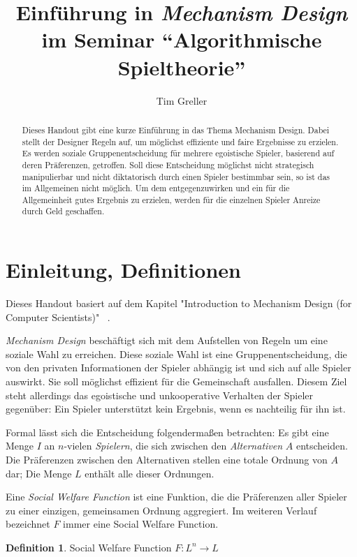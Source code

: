 \documentclass[a4paper,11pt]{article}
\title{Einführung in \textit{Mechanism Design} \\ \Large im Seminar ``Algorithmische Spieltheorie''}
\author{Tim Greller}
\theoremstyle{definition}
\newtheorem{definition}{Definition}
\theoremstyle{plain}
\theoremstyle{definition}
\begin{document}
\maketitle

\begin{abstract}
	Dieses Handout gibt eine kurze Einführung in das Thema Mechanism Design. Dabei stellt der Designer Regeln auf, um möglichst effiziente und faire Ergebnisse zu erzielen. Es werden soziale Gruppenentscheidung für mehrere egoistische Spieler, basierend auf deren Präferenzen, getroffen. Soll diese Entscheidung möglichst nicht strategisch manipulierbar und nicht diktatorisch durch einen Spieler bestimmbar sein, so ist das im Allgemeinen nicht möglich. Um dem entgegenzuwirken und ein für die Allgemeinheit gutes Ergebnis zu erzielen, werden für die einzelnen Spieler Anreize durch Geld geschaffen.
\end{abstract}

\setcounter{page}{0}
\fancyhead{}
\fancyhead[ER]{\leftmark}
\fancyhead[OL]{\rightmark}
\fancyhead[EL,OR]{\thepage}
\pagestyle{fancy}

\section{Einleitung, Definitionen}
Dieses Handout basiert auf dem Kapitel "Introduction to Mechanism Design (for Computer Scientists)" ~\cite{nis07}.

\emph{Mechanism Design} beschäftigt sich mit dem Aufstellen von Regeln um eine soziale Wahl zu erreichen. Diese soziale Wahl ist eine Gruppenentscheidung, die von den privaten Informationen der Spieler abhängig ist und sich auf alle Spieler auswirkt. Sie soll möglichst effizient für die Gemeinschaft ausfallen. Diesem Ziel steht allerdings das egoistische und unkooperative Verhalten der Spieler gegenüber: Ein Spieler unterstützt kein Ergebnis, wenn es nachteilig für ihn ist.~\cite{ste08}

Formal lässt sich die Entscheidung folgendermaßen betrachten:
Es gibt eine Menge $I$ an $n$-vielen \emph{Spielern}, die sich zwischen den \emph{Alternativen} $A$ entscheiden. Die Präferenzen zwischen den Alternativen stellen eine totale Ordnung von $A$ dar; Die Menge $L$ enthält alle dieser Ordnungen.

Eine \emph{Social Welfare Function} ist eine Funktion, die die Präferenzen aller Spieler zu einer einzigen, gemeinsamen Ordnung aggregiert. Im weiteren Verlauf bezeichnet $F$ immer eine Social Welfare Function.
\begin{definition}
	\label{def:socialwelfarefunc}
	Social Welfare Function $F : L^n \rightarrow L$
\end{definition}
\end{document}
